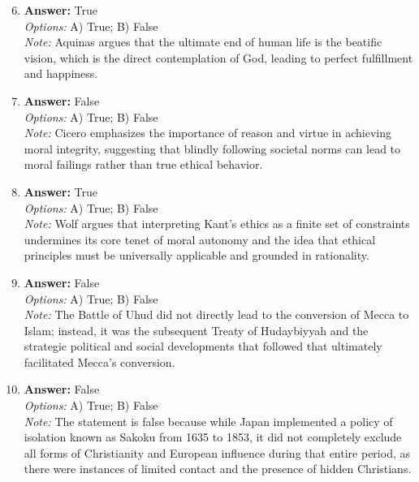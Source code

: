 \documentclass[12pt]{article}
\begin{document}
\begin{enumerate}[label=\arabic*.]
\setcounter{enumi}{5}
\item \textbf{Answer:} True
\\ \textit{Options:} A) True; B) False
\\ \textit{Note:} Aquinas argues that the ultimate end of human life is the beatific vision, which is the direct contemplation of God, leading to perfect fulfillment and happiness.
\item \textbf{Answer:} False
\\ \textit{Options:} A) True; B) False
\\ \textit{Note:} Cicero emphasizes the importance of reason and virtue in achieving moral integrity, suggesting that blindly following societal norms can lead to moral failings rather than true ethical behavior.
\item \textbf{Answer:} True
\\ \textit{Options:} A) True; B) False
\\ \textit{Note:} Wolf argues that interpreting Kant's ethics as a finite set of constraints undermines its core tenet of moral autonomy and the idea that ethical principles must be universally applicable and grounded in rationality.
\item \textbf{Answer:} False
\\ \textit{Options:} A) True; B) False
\\ \textit{Note:} The Battle of Uhud did not directly lead to the conversion of Mecca to Islam; instead, it was the subsequent Treaty of Hudaybiyyah and the strategic political and social developments that followed that ultimately facilitated Mecca's conversion.
\item \textbf{Answer:} False
\\ \textit{Options:} A) True; B) False
\\ \textit{Note:} The statement is false because while Japan implemented a policy of isolation known as Sakoku from 1635 to 1853, it did not completely exclude all forms of Christianity and European influence during that entire period, as there were instances of limited contact and the presence of hidden Christians.
\end{enumerate}
\end{document}
